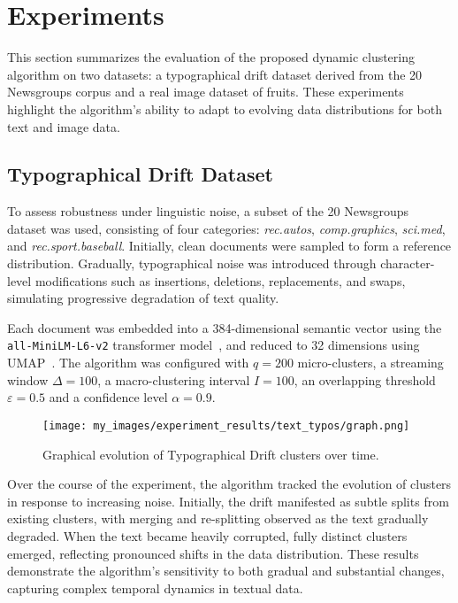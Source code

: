 \section{Experiments}\label{sec:experiments}

This section summarizes the evaluation of the proposed dynamic clustering
algorithm on two datasets: a typographical drift dataset derived from the 20
Newsgroups corpus and a real image dataset of fruits. These experiments highlight the
algorithm's ability to adapt to evolving data distributions for both text and
image data.

\subsection{Typographical Drift Dataset}\label{subsec:typographical_drift}

To assess robustness under linguistic noise, a subset of the 20
Newsgroups~\cite{20newsgroups} dataset was used, consisting of four categories:
\emph{rec.autos}, \emph{comp.graphics}, \emph{sci.med}, and
\emph{rec.sport.baseball}. Initially, clean documents were sampled to form a
reference distribution. Gradually, typographical noise was introduced through
character-level modifications such as insertions, deletions, replacements, and
swaps, simulating progressive degradation of text quality.

Each document was embedded into a 384-dimensional semantic vector using the
\texttt{all-MiniLM-L6-v2} transformer model~\cite{sentence-transformers}, and
reduced to 32 dimensions using UMAP~\cite{umap}. The algorithm was configured
with $q=200$ micro-clusters, a streaming window $\Delta=100$, a
macro-clustering interval $I=100$, an overlapping threshold $\varepsilon=0.5$
and a confidence level $\alpha=0.9$.



\begin{figure}[H]
    \centering
    \texttt{[image: my\_images/experiment\_results/text\_typos/graph.png]}
    \caption{Graphical evolution of Typographical Drift clusters over time.}
\end{figure}

Over the course of the experiment, the algorithm tracked the evolution of
clusters in response to increasing noise. Initially, the drift manifested as
subtle splits from existing clusters, with merging and re-splitting observed as
the text gradually degraded. When the text became heavily corrupted, fully
distinct clusters emerged, reflecting pronounced shifts in the data
distribution. These results demonstrate the algorithm's sensitivity to both
gradual and substantial changes, capturing complex temporal dynamics in textual
data.

